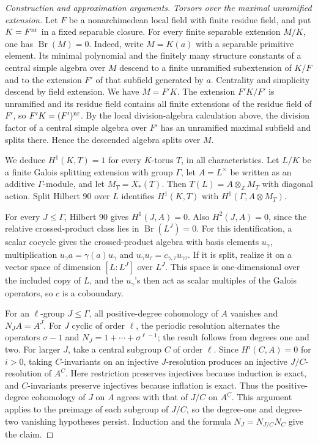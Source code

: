 \documentclass[11pt,a4paper,openany,oneside]{book}
\theoremstyle{resultstyle}
\theoremstyle{definition}
\numberwithin{equation}{chapter}
\begin{document}
\begin{proof}[Construction and approximation arguments]
\medskip\noindent
\textit{Torsors over the maximal unramified extension.}
Let \(F\) be a nonarchimedean local field with finite residue
field, and put \(K=F^{\rm nr}\) in a fixed separable closure.
For every finite separable extension \(M/K\), one has
\(\operatorname{Br}(M)=0\). Indeed, write \(M=K(a)\) with a
separable primitive element. Its minimal polynomial and the
finitely many structure constants of a central simple algebra
over \(M\) descend to a finite unramified subextension of \(K/F\)
and to the extension \(F'\) of that subfield generated by \(a\).
Centrality and simplicity descend by field extension. We have
\(M=F'K\). The extension \(F'K/F'\) is unramified and its
residue field contains all finite extensions of the residue
field of \(F'\), so \(F'K=(F')^{\rm nr}\). By the local
division-algebra calculation above, the division factor
of a central simple algebra over \(F'\) has an unramified
maximal subfield and splits there. Hence the descended algebra
splits over \(M\).

We deduce \(H^1(K,T)=1\) for every \(K\)-torus \(T\), in
all characteristics. Let \(L/K\) be a finite Galois splitting
extension with group \(\Gamma\), let \(A=L^\times\) be written
as an additive \(\Gamma\)-module, and let \(M_T=X_*(T)\).
Then \(T(L)=A\otimes_{\mathbb Z} M_T\) with diagonal action.
Split Hilbert 90 over \(L\) identifies \(H^1(K,T)\) with
\(H^1(\Gamma,A\otimes M_T)\).

For every \(J\leq\Gamma\), Hilbert 90 gives \(H^1(J,A)=0\).
Also \(H^2(J,A)=0\), since the relative crossed-product
class lies in \(\operatorname{Br}(L^J)=0\). For this
identification, a scalar cocycle gives the crossed-product
algebra with basis elements \(u_\gamma\), multiplication
\(u_\gamma a=\gamma(a)u_\gamma\) and
\(u_\gamma u_\tau=c_{\gamma,\tau}u_{\gamma\tau}\).
If it is split, realize it on a vector space of dimension
\([L:L^J]\) over \(L^J\). This space is one-dimensional
over the included copy of \(L\), and the \(u_\gamma\)'s
then act as scalar multiples of the Galois operators, so
\(c\) is a coboundary.

For an \(\ell\)-group \(J\leq\Gamma\), all positive-degree
cohomology of \(A\) vanishes and \(N_J A=A^J\). For \(J\)
cyclic of order \(\ell\), the periodic resolution alternates
the operators \(\sigma-1\) and \(N_J=1+\cdots+\sigma^{\ell-1}\);
the result follows from degrees one and two. For larger
\(J\), take a central subgroup \(C\) of order \(\ell\).
Since \(H^i(C,A)=0\) for \(i>0\), taking \(C\)-invariants
on an injective \(J\)-resolution produces an injective
\(J/C\)-resolution of \(A^C\). Here restriction preserves
injectives because induction is exact, and \(C\)-invariants
preserve injectives because inflation is exact. Thus the
positive-degree cohomology of \(J\) on \(A\) agrees with
that of \(J/C\) on \(A^C\). This argument applies to
the preimage of each subgroup of \(J/C\), so the degree-one
and degree-two vanishing hypotheses persist. Induction
and the formula \(N_J=N_{J/C}N_C\) give the claim.


\end{proof}
\end{document}
